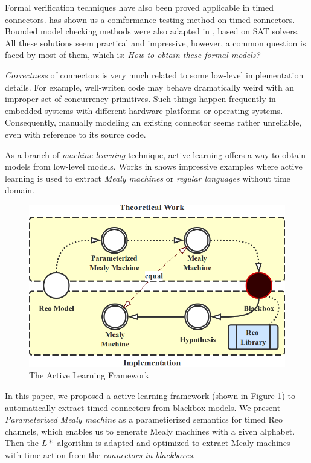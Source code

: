\documentclass[conference, a4paper]{IEEEtran}
\begin{document}
Formal verification techniques have also been proved applicable in timed connectors.
\cite{DBLP:conf/tase/LiCWS15} has shown us a comformance testing method on timed connectors.
Bounded model checking methods were also adapted in \cite{DBLP:journals/scp/Kemper12}, based on SAT
solvers. All these solutions seem practical and impressive, however, a common question is faced by
most of them, which is: \emph{How to obtain these formal models?}

\emph{Correctness} of connectors is very much related to some low-level implementation details.
For example, well-writen code may behave dramatically weird with an improper set of concurrency
primitives. Such things happen frequently in embedded systems with different hardware platforms or
operating systems. Consequently, manually modeling an existing connector seems rather unreliable,
even with reference to its source code.

As a branch of \emph{machine learning} technique, active learning offers a way to obtain models from
low-level models. Works in \cite{DBLP:journals/mt/Daelemans10, DBLP:journals/iandc/Angluin87,
DBLP:conf/fase/RaffeltS06} shows impressive examples where active learning is used to extract
\emph{Mealy machines} or \emph{regular languages} without time domain.

\begin{figure}[h]
  \begin{center}
    \includegraphics[width=.4\textwidth]{./images/howto.png}
  \end{center}
  \caption{The Active Learning Framework}
  \label{fig:howto}
\end{figure}

In this paper, we proposed a active learning framework (shown in Figure \ref{fig:howto}) to
automatically extract timed connectors from blackbox models. We present \emph{Parameterized Mealy
machine} as a parametierized semantics for timed Reo channels, which enables us to generate Mealy
machines with a given alphabet. Then the $L*$ algorithm is adapted and optimized to extract Mealy
machines with time action from the \emph{connectors in blackboxes}.
\end{document}
